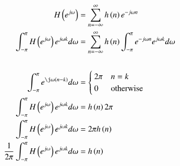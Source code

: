 \documentclass[journal,12pt,twocolumn]{IEEEtran}
\renewcommand\thesection{\arabic{section}}
\begin{document}
\begin{enumerate}[label=\thesection.\arabic*]
\solution 
\begin{align}
	H\brak{e^{j\omega}} &= \sum_{n=-\infty}^{\infty} h\brak{n} e^{-j\omega n}
	\\
	\int_{-\pi}^{\pi}H\brak{e^{j\omega}}e^{j\omega k}d\omega &= \sum_{n=-\infty}^{\infty} h\brak{n} \int_{-\pi}^{\pi} e^{-j\omega n}e^{j\omega k}d\omega
	\\
	\\
		\int_{-\pi}^{\pi}e^{\j\omega(n - k)}d\omega &=
		\begin{cases}
			2\pi & n = k \\
			0 & \textrm{otherwise}
		\end{cases}
    \\
	\int_{-\pi}^{\pi}H\brak{e^{j\omega}}e^{j\omega k}d\omega &= h\brak{n} 2\pi
    \\
    \int_{-\pi}^{\pi}H\brak{e^{j\omega}}e^{j\omega k}d\omega &= 2\pi h\brak{n} 
	\\
	\frac{1}{2\pi} \int_{-\pi}^{\pi}H\brak{e^{j\omega}}e^{j\omega k}d\omega &= h\brak{n} 
\end{align} 
\end{enumerate}
\end{document}
